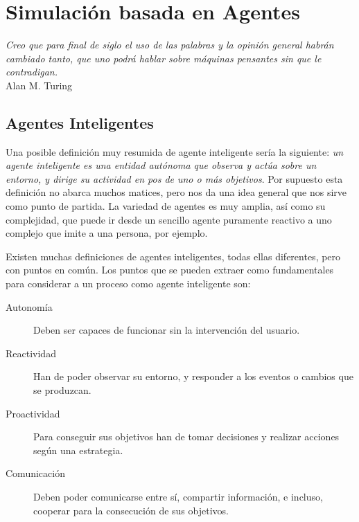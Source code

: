 
\chapter*{Simulación basada en Agentes} \label{cap1}

\begin{flushright}
\begin{minipage}{7.85cm}
    {\em Creo que para final de siglo el uso de las palabras y la opinión
    general habrán cambiado tanto, que uno podrá hablar sobre máquinas pensantes
    sin que le contradigan.} \\ Alan M. Turing
\end{minipage}
\end{flushright}

\vspace*{5mm}

\section*{Agentes Inteligentes}


Una posible definición muy resumida de agente inteligente sería la siguiente:
{\em un agente inteligente es una entidad autónoma que observa y actúa sobre un
entorno, y dirige su actividad en pos de uno o más objetivos}. Por supuesto
esta definición no abarca muchos matices, pero nos da una idea general que nos
sirve como punto de partida. La variedad de agentes es muy amplia, así como
su complejidad, que puede ir desde un sencillo agente puramente reactivo a uno
complejo que imite a una persona, por ejemplo.

Existen muchas definiciones de agentes inteligentes, todas ellas diferentes,
pero con puntos en común. Los puntos que se pueden extraer como fundamentales
para considerar a un proceso como agente inteligente son:

\begin{description}
 \item[Autonomía]Deben ser capaces de funcionar sin la intervención del usuario.
 \item[Reactividad]Han de poder observar su entorno, y responder a los eventos
 o cambios que se produzcan.
 \item[Proactividad]Para conseguir sus objetivos han de tomar decisiones y
 realizar acciones según una estrategia.
 \item[Comunicación]Deben poder comunicarse entre sí, compartir información, e
 incluso, cooperar para la consecución de sus objetivos.
\end{description}


